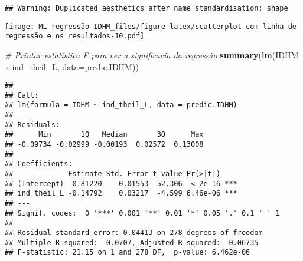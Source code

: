 \documentclass[
]{article}
\newenvironment{Shaded}{\begin{snugshade}}{\end{snugshade}}
\newcommand{\AttributeTok}[1]{\textcolor[rgb]{0.13,0.29,0.53}{#1}}
\newcommand{\CommentTok}[1]{\textcolor[rgb]{0.56,0.35,0.01}{\textit{#1}}}
\newcommand{\FunctionTok}[1]{\textcolor[rgb]{0.13,0.29,0.53}{\textbf{#1}}}
\newcommand{\NormalTok}[1]{#1}
\newcommand{\SpecialCharTok}[1]{\textcolor[rgb]{0.81,0.36,0.00}{\textbf{#1}}}
\begin{document}
\begin{verbatim}
## Warning: Duplicated aesthetics after name standardisation: shape
\end{verbatim}

\texttt{[image: ML-regressão-IDHM\_files/figure-latex/scatterplot com linha de regressão e os resultados-10.pdf]}

\begin{Shaded}
\begin{Highlighting}[]
\CommentTok{\# Printar estatística F para ver a significacia da regressão}
\FunctionTok{summary}\NormalTok{(}\FunctionTok{lm}\NormalTok{(IDHM }\SpecialCharTok{\textasciitilde{}}\NormalTok{ ind\_theil\_L, }\AttributeTok{data=}\NormalTok{predic.IDHM))}
\end{Highlighting}
\end{Shaded}

\begin{verbatim}
## 
## Call:
## lm(formula = IDHM ~ ind_theil_L, data = predic.IDHM)
## 
## Residuals:
##      Min       1Q   Median       3Q      Max 
## -0.09734 -0.02999 -0.00193  0.02572  0.13008 
## 
## Coefficients:
##             Estimate Std. Error t value Pr(>|t|)    
## (Intercept)  0.81220    0.01553  52.306  < 2e-16 ***
## ind_theil_L -0.14792    0.03217  -4.599 6.46e-06 ***
## ---
## Signif. codes:  0 '***' 0.001 '**' 0.01 '*' 0.05 '.' 0.1 ' ' 1
## 
## Residual standard error: 0.04413 on 278 degrees of freedom
## Multiple R-squared:  0.0707, Adjusted R-squared:  0.06735 
## F-statistic: 21.15 on 1 and 278 DF,  p-value: 6.462e-06
\end{verbatim}
\end{document}

